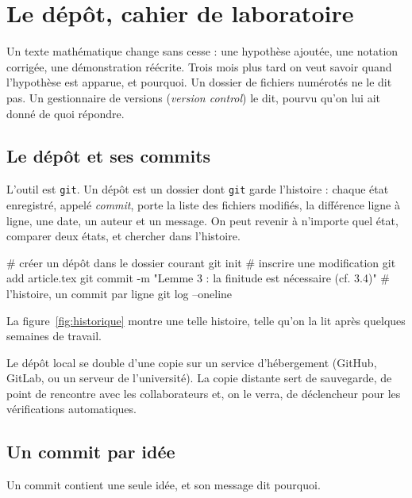 \chapter{Le dépôt, cahier de laboratoire}\label{ch:depot}

Un texte mathématique change sans cesse : une hypothèse ajoutée, une notation corrigée, une
démonstration réécrite. Trois mois plus tard on veut savoir quand l'hypothèse est apparue,
et pourquoi. Un dossier de fichiers numérotés  ne le dit
pas. Un gestionnaire de versions (\emph{version control}) le dit, pourvu qu'on lui ait donné de quoi répondre.

\section{Le dépôt et ses commits}

L'outil est \texttt{git}. Un dépôt est un dossier dont \texttt{git} garde l'histoire : chaque
état enregistré, appelé \emph{commit}, porte la liste des fichiers modifiés, la différence
ligne à ligne, une date, un auteur et un message. On peut revenir à n'importe quel état,
comparer deux états, et chercher dans l'histoire.

\begin{terminal}
# créer un dépôt dans le dossier courant
git init
# inscrire une modification
git add article.tex
git commit -m "Lemme 3 : la finitude est nécessaire (cf. 3.4)"
# l'histoire, un commit par ligne
git log --oneline
\end{terminal}

La figure~\ref{fig:historique} montre une telle histoire, telle qu'on la lit après
quelques semaines de travail.



Le dépôt local se double d'une copie sur un service d'hébergement (GitHub, GitLab, ou un
serveur de l'université). La copie distante sert de sauvegarde, de point de rencontre avec
les collaborateurs et, on le verra, de déclencheur pour les vérifications automatiques.

\section{Un commit par idée}

\begin{regle}
Un commit contient une seule idée, et son message dit pourquoi.
\end{regle}

